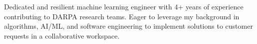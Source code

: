 

\begin{cvparagraph}

Dedicated and resilient machine learning engineer with 4+ years of experience contributing to DARPA research teams. Eager to leverage my background in algorithms, AI/ML, and software engineering to implement solutions to customer requests in a collaborative workspace.
\end{cvparagraph}
